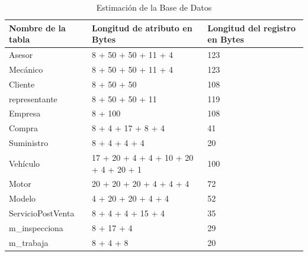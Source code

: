 \documentclass[12pt]{article}
\begin{document}
\begin{table}[h]
    \centering
    \begin{tabular}{|l|p{4cm}|p{4cm}|}
    \hline
    \textbf{Nombre de la tabla} & \textbf{Longitud de atributo en Bytes} & \textbf{Longitud del registro en Bytes} \\ \hline
    Asesor                      & 8 + 50 + 50 + 11 + 4                  & 123                                    \\ \hline
    Mecánico                    & 8 + 50 + 50 + 11 + 4                  & 123                                    \\ \hline
    Cliente                     & 8 + 50 + 50                           & 108                                    \\ \hline
    representante                   & 8 + 50 + 50 + 11                      & 119                                    \\ \hline
    Empresa                     & 8 + 100                               & 108                                    \\ \hline
    Compra                      & 8 + 4 + 17 + 8 + 4                    & 41                                     \\ \hline
    Suministro                  & 8 + 4 + 4 + 4                         & 20                                     \\ \hline
    Vehículo                    & 17 + 20 + 4 + 4 + 10 + 20 + 4 + 20 + 1 & 100                                    \\ \hline
    Motor                       & 20 + 20 + 20 + 4 + 4 + 4              & 72                                     \\ \hline
    Modelo                      & 4 + 20 + 20 + 4 + 4                   & 52                                     \\ \hline
    ServicioPostVenta           & 8 + 4 + 4 + 15 + 4                    & 35                                     \\ \hline
    m\_inspecciona              & 8 + 17 + 4                            & 29                                     \\ \hline
    m\_trabaja                  & 8 + 4 + 8                             & 20                                     \\ \hline
    \end{tabular}
    \caption{Estimación de la Base de Datos}
\end{table}
\end{document}
